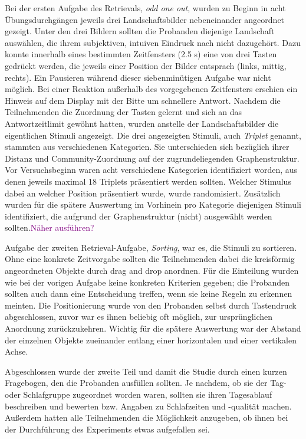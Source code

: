 \documentclass[preprint,12pt]{elsarticle}
\begin{document}
Bei der ersten Aufgabe des Retrievals, \textit{odd one out}, wurden zu Beginn in acht Übungsdurchgängen jeweils drei Landschaftsbilder nebeneinander angeordnet gezeigt. Unter den drei Bildern sollten die Probanden diejenige Landschaft auswählen, die ihrem subjektiven, intuiven Eindruck nach nicht dazugehört. Dazu konnte innerhalb eines bestimmten Zeitfensters (2.5 s) eine von drei Tasten gedrückt werden, die jeweils einer Position der Bilder entsprach (links, mittig, rechts). Ein Pausieren während dieser siebenminütigen Aufgabe war nicht möglich. Bei einer Reaktion außerhalb des vorgegebenen Zeitfensters erschien ein Hinweis auf dem Display mit der Bitte um schnellere Antwort. Nachdem die Teilnehmenden die Zuordnung der Tasten gelernt und sich an das Antwortzeitlimit gewöhnt hatten, wurden anstelle der Landschaftsbilder die eigentlichen Stimuli angezeigt. Die drei angezeigten Stimuli, auch \textit{Triplet} genannt, stammten aus verschiedenen Kategorien. Sie unterschieden sich bezüglich ihrer Distanz und Community-Zuordnung auf der zugrundeliegenden Graphenstruktur. Vor Versuchsbeginn waren acht verschiedene Kategorien identifiziert worden, aus denen jeweils maximal 18 Triplets präsentiert werden sollten. Welcher Stimulus dabei an welcher Position präsentiert wurde, wurde randomisiert. Zusätzlich wurden für die spätere Auswertung im Vorhinein pro Kategorie diejenigen Stimuli identifiziert, die aufgrund der Graphenstruktur (nicht) ausgewählt werden sollten.\textcolor{purple}{Näher ausführen?}

Aufgabe der zweiten Retrieval-Aufgabe, \textit{Sorting}, war es, die Stimuli zu sortieren. Ohne eine konkrete Zeitvorgabe sollten die Teilnehmenden dabei die kreisförmig angeordneten Objekte durch drag and drop anordnen. Für die Einteilung wurden wie bei der vorigen Aufgabe keine konkreten Kriterien gegeben; die Probanden sollten auch dann eine Entscheidung treffen, wenn sie keine Regeln zu erkennen meinten. Die Positionierung wurde von den Probanden selbst durch Tastendruck abgeschlossen, zuvor war es ihnen beliebig oft möglich, zur ursprünglichen Anordnung zurückzukehren. Wichtig für die spätere Auswertung war der Abstand der einzelnen Objekte zueinander entlang einer horizontalen und einer vertikalen Achse.

Abgeschlossen wurde der zweite Teil und damit die Studie durch einen kurzen Fragebogen, den die Probanden ausfüllen sollten. Je nachdem, ob sie der Tag- oder Schlafgruppe zugeordnet worden waren, sollten sie ihren Tagesablauf beschreiben und bewerten bzw. Angaben zu Schlafzeiten und -qualität machen. Außerdem hatten alle Teilnehmenden die Möglichkeit anzugeben, ob ihnen bei der Durchführung des Experiments etwas aufgefallen sei.
\end{document}
